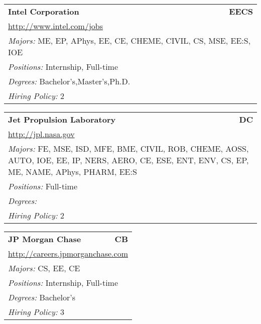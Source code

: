 \documentclass[twoside]{article}
\begin{document}
\begin{center}
\begin{multicols}{3}
\begin{FlushLeft}
\begin{minipage}{\columnwidth}
\end{minipage}
 
\begin{minipage}{\columnwidth}\begin{tabularx}{.95\columnwidth}{Xr}
                 {\Large\bf Intel Corporation} & {\Large\bf EECS}\\
    \multicolumn{2}{p{.95\columnwidth}}{\url{http://www.intel.com/jobs}}\\
    \multicolumn{2}{p{.95\columnwidth}}{\emph{Majors:} ME, EP, APhys, EE, CE, CHEME, CIVIL, CS, MSE, EE:S, IOE}\\
    \multicolumn{2}{p{.95\columnwidth}}{\emph{Positions:} Internship, Full-time}\\
    \multicolumn{2}{p{.95\columnwidth}}{\emph{Degrees:} Bachelor's,Master's,Ph.D.}\\
    \multicolumn{2}{p{.95\columnwidth}}{\emph{Hiring Policy:} 2}\\
    \end{tabularx}
    
\end{minipage}
 
\begin{minipage}{\columnwidth}\begin{tabularx}{.95\columnwidth}{Xr}
                 {\Large\bf Jet Propulsion Laboratory} & {\Large\bf DC}\\
    \multicolumn{2}{p{.95\columnwidth}}{\url{http://jpl.nasa.gov}}\\
    \multicolumn{2}{p{.95\columnwidth}}{\emph{Majors:} FE, MSE, ISD, MFE, BME, CIVIL, ROB, CHEME, AOSS, AUTO, IOE, EE, IP, NERS, AERO, CE, ESE, ENT, ENV, CS, EP, ME, NAME, APhys, PHARM, EE:S}\\
    \multicolumn{2}{p{.95\columnwidth}}{\emph{Positions:} Full-time}\\
    \multicolumn{2}{p{.95\columnwidth}}{\emph{Degrees:} }\\
    \multicolumn{2}{p{.95\columnwidth}}{\emph{Hiring Policy:} 2}\\
    \end{tabularx}
    
\end{minipage}
 
\begin{minipage}{\columnwidth}\begin{tabularx}{.95\columnwidth}{Xr}
                 {\Large\bf JP Morgan Chase} & {\Large\bf CB}\\
    \multicolumn{2}{p{.95\columnwidth}}{\url{http://careers.jpmorganchase.com}}\\
    \multicolumn{2}{p{.95\columnwidth}}{\emph{Majors:} CS, EE, CE}\\
    \multicolumn{2}{p{.95\columnwidth}}{\emph{Positions:} Internship, Full-time}\\
    \multicolumn{2}{p{.95\columnwidth}}{\emph{Degrees:} Bachelor's}\\
    \multicolumn{2}{p{.95\columnwidth}}{\emph{Hiring Policy:} 3}\\
    \end{tabularx}
    

\end{minipage}
\end{FlushLeft}
\end{multicols}
\end{center}
\end{document}

